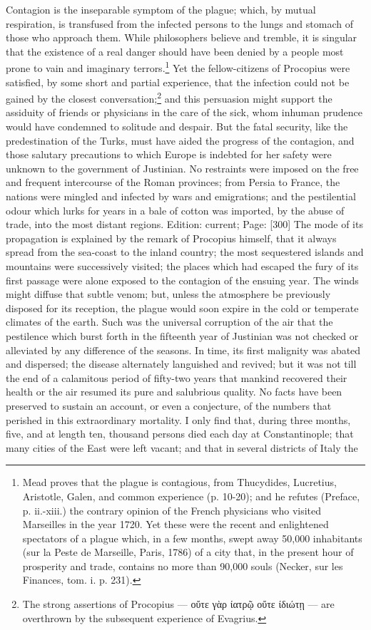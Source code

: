 Contagion is the inseparable symptom of the plague; which, by mutual respiration, is transfused from the infected persons to the lungs and stomach of those who approach them. While philosophers believe and tremble, it is singular that the existence of a real danger should have been denied by a people most prone to vain and imaginary terrors.\footnote{Mead proves that the plague is contagious, from Thucydides, Lucretius, Aristotle, Galen, and common experience (p. 10-20); and he refutes (Preface, p. ii.-xiii.) the contrary opinion of the French physicians who visited Marseilles in the year 1720. Yet these were the recent and enlightened spectators of a plague which, in a few months, swept away 50,000 inhabitants (sur la Peste de Marseille, Paris, 1786) of a city that, in the present hour of prosperity and trade, contains no more than 90,000 souls (Necker, sur les Finances, tom. i. p. 231).} Yet the fellow-citizens of Procopius were satisfied, by some short and partial experience, that the infection could not be gained by the closest conversation;\footnote{The strong assertions of Procopius \texthebrew{—} \textgreek{ο\texthebrew{ὔ}τε γ\texthebrew{ὰ}ρ ίατρ\texthebrew{ῷ} ο\texthebrew{ὔ}τε ίδιώτ\texthebrew{ῃ}} \texthebrew{—} are overthrown by the subsequent experience of Evagrius.} and this persuasion might support the assiduity of friends or physicians in the care of the sick, whom inhuman prudence would have condemned to solitude and despair. But the fatal security, like the predestination of the Turks, must have aided the progress of the contagion, and those salutary precautions to which Europe is indebted for her safety were unknown to the government of Justinian. No restraints were imposed on the free and frequent intercourse of the Roman provinces; from Persia to France, the nations were mingled and infected by wars and emigrations; and the pestilential odour which lurks for years in a bale of cotton was imported, by the abuse of trade, into the most distant regions. Edition: current; Page: [300] The mode of its propagation is explained by the remark of Procopius himself, that it always spread from the sea-coast to the inland country; the most sequestered islands and mountains were successively visited; the places which had escaped the fury of its first passage were alone exposed to the contagion of the ensuing year. The winds might diffuse that subtle venom; but, unless the atmosphere be previously disposed for its reception, the plague would soon expire in the cold or temperate climates of the earth. Such was the universal corruption of the air that the pestilence which burst forth in the fifteenth year of Justinian was not checked or alleviated by any difference of the seasons. In time, its first malignity was abated and dispersed; the disease alternately languished and revived; but it was not till the end of a calamitous period of fifty-two years that mankind recovered their health or the air resumed its pure and salubrious quality. No facts have been preserved to sustain an account, or even a conjecture, of the numbers that perished in this extraordinary mortality. I only find that, during three months, five, and at length ten, thousand persons died each day at Constantinople; that many cities of the East were left vacant; and that in several districts of Italy the 
